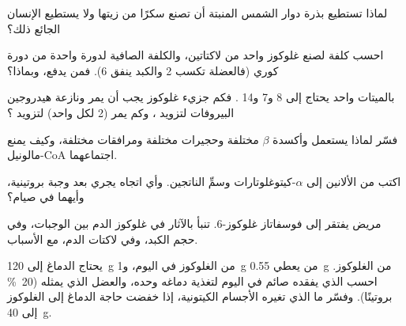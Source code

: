 \begin{exercise}[$\star$]\label{exo:b1:biosyntheses-integration:4}
لماذا تستطيع بذرة دوار الشمس المنبتة أن تصنع سكرًا من زيتها ولا
يستطيع الإنسان الجائع ذلك؟
\end{exercise}

\begin{exercise}[$\star\star$]\label{exo:b1:biosyntheses-integration:5}
احسب كلفة  لصنع غلوكوز واحد من لاكتاتين، والكلفة الصافية لدورة
واحدة من دورة كوري (فالعضلة تكسب 2 والكبد ينفق 6). فمن يدفع، وبماذا؟
\end{exercise}

\begin{exercise}[$\star\star$]\label{exo:b1:biosyntheses-integration:6}
بالميتات واحد يحتاج إلى 8  و7  و14 . فكم جزيء
غلوكوز يجب أن يمر  ونازعة هيدروجين البيروفات لتزويد
، وكم يمر  (2  لكل واحد) لتزويد
؟
\end{exercise}

\begin{exercise}[$\star\star$]\label{exo:b1:biosyntheses-integration:7}
فسّر لماذا يستعمل  وأكسدة $\beta$  مختلفة
وحجيرات مختلفة ومرافقات مختلفة، وكيف يمنع مالونيل-CoA اجتماعهما.
\end{exercise}

\begin{exercise}[$\star\star$]\label{exo:b1:biosyntheses-integration:8}
اكتب  من الألانين إلى $\alpha$-كيتوغلوتارات وسمِّ
الناتجين. وأي اتجاه يجري بعد وجبة بروتينية، وأيهما في صيام؟
\end{exercise}

\begin{exercise}[$\star\star$]\label{exo:b1:biosyntheses-integration:9}
مريض يفتقر إلى فوسفاتاز غلوكوز-6. تنبأ بالآثار في غلوكوز الدم بين
الوجبات، وفي حجم الكبد، وفي لاكتات الدم، مع الأسباب.
\end{exercise}

\begin{exercise}[$\star\star\star$]\label{exo:b1:biosyntheses-integration:10}
يحتاج الدماغ إلى \qty{120}{g} من الغلوكوز في اليوم، و\qty{1}{g} من
 يعطي \qty{0.55}{g} من الغلوكوز. احسب  الذي يفقده
صائم في اليوم لتغذية دماغه  وحده، والعضل الذي يمثله
(\qty{20}{\%} بروتينًا). وفسّر ما الذي تغيره الأجسام الكيتونية، إذا
خفضت حاجة الدماغ إلى الغلوكوز إلى \qty{40}{g}.
\end{exercise}

